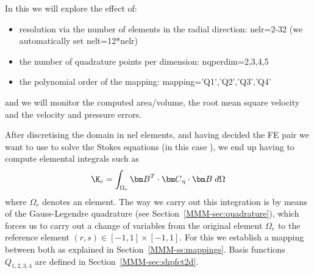 \noindent In this \stone we will explore the effect of:
\begin{itemize}
\item resolution via the number of elements in the radial direction: {\python nelr=2-32} (we automatically set {\python nelt=12*nelr})
\item the number of quadrature points per dimension: {\python nqperdim=2,3,4,5}
\item the polynomial order of the mapping: {\python mapping='Q1','Q2','Q3','Q4'}
\end{itemize}
and we will monitor the computed area/volume, the root mean square velocity and the velocity and pressure errors.

After discretising the domain in {\python nel} elements, and having decided the FE
pair we want to use to solve the Stokes equations (in this case \QtwoQone), we end up 
having to compute elemental integrals such as 
\[
\K_e = \int_{\Omega_e} {\bm B}^T\cdot {\bm C}_\eta \cdot {\bm B} \; d\Omega
\]
where $\Omega_e$ denotes an element.
The way we carry out this integration is by means of the Gauss-Legendre quadrature
(see Section~\ref{MMM-sec:quadrature}), which 
forces us to carry out a change of variables from the original element $\Omega_e$ 
to the reference element $(r,s) \in [-1,1]\times [-1,1]$. For this we establish a mapping between both 
as explained in Section~\ref{MMM-ss:mappings}.
Basis functions $Q_{1,2,3,4}$ are defined in Section~\ref{MMM-sec:shpfct2d}.

